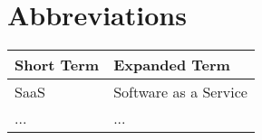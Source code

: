\chapter{Abbreviations}

\begin{tabular}{p{40mm}|p{100mm}}
	\textbf{Short Term}&\textbf{Expanded Term}\\
	\hline
	SaaS&Software as a Service\\
	...&...
\end{tabular}
